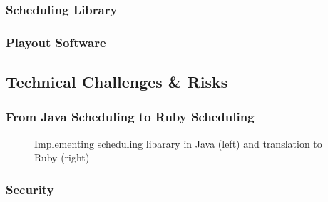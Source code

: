 \documentclass[a4paper, titlepage]{article}
\begin{document}


\subsubsection{Scheduling Library}


\subsubsection{Playout Software}




\subsection{Technical Challenges \& Risks}


\subsubsection{From Java Scheduling to Ruby Scheduling}

\begin{figure}[ht]
  \begin{minipage}{0.49\textwidth}
  \end{minipage}
  \begin{minipage}{0.49\textwidth}
  \end{minipage}
    
  \caption{Implementing scheduling libarary in Java (left) and translation to Ruby (right)}
  \label{fig:impl_translation}
\end{figure}


\subsubsection{Security}
\end{document}
